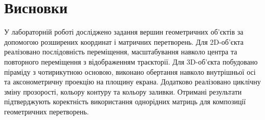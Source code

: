 \documentclass[12pt,a4paper]{article}
\begin{document}
\section{Висновки}

У лабораторній роботі досліджено задання вершин геометричних об’єктів за допомогою розширених координат і матричних перетворень. Для 2D-об’єкта реалізовано послідовність переміщення, масштабування навколо центра та повторного переміщення з відображенням траєкторії. Для 3D-об’єкта побудовано піраміду з чотирикутною основою, виконано обертання навколо внутрішньої осі та аксонометричну проекцію на площину екрана. Додатково реалізовано циклічну зміну прозорості, кольору контуру та кольору заливки. Отримані результати підтверджують коректність використання однорідних матриць для композиції геометричних перетворень.
\end{document}
